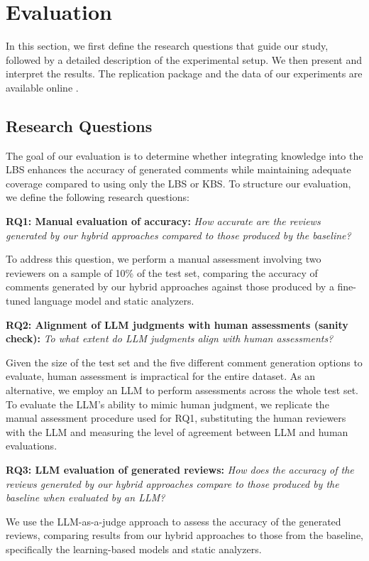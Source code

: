 \section{Evaluation}
\label{sec:evaluation}

In this section, we first define the research questions that guide our study, followed by a detailed description of the experimental setup. We then present and interpret the results.
The replication package and the data of our experiments are available online \cite{github_replication, zenodo_14061110}.

\subsection{Research Questions}
The goal of our evaluation is to determine whether integrating knowledge into the LBS enhances the accuracy of generated comments while maintaining adequate coverage compared to using only the LBS or KBS. To structure our evaluation, we define the following research questions:

\textbf{RQ1: Manual evaluation of accuracy:} 
\emph{How accurate are the reviews generated by our hybrid approaches compared to those produced by the baseline?}

To address this question, we perform a manual assessment involving two reviewers on a sample of 10\% of the test set, comparing the accuracy of comments generated by our hybrid approaches against those produced by a fine-tuned language model and static analyzers.

\textbf{RQ2: Alignment of LLM judgments with human assessments (sanity check):}
\emph{To what extent do LLM judgments align with human assessments?}

Given the size of the test set and the five different comment generation options to evaluate, human assessment is impractical for the entire dataset. As an alternative, we employ an LLM to perform assessments across the whole test set. To evaluate the LLM's ability to mimic human judgment, we replicate the manual assessment procedure used for RQ1, substituting the human reviewers with the LLM and measuring the level of agreement between LLM and human evaluations.

\textbf{RQ3: LLM evaluation of generated reviews:}
\emph{How does the accuracy of the reviews generated by our hybrid approaches compare to those produced by the baseline when evaluated by an LLM?}

We use the LLM-as-a-judge approach to assess the accuracy of the generated reviews, comparing results from our hybrid approaches to those from the baseline, specifically the learning-based models and static analyzers.


